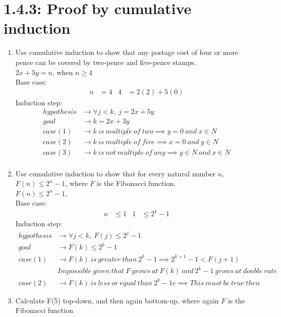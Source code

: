\documentclass{article}
\begin{document}
\section*{1.4.3: Proof by cumulative induction}
\begin{enumerate}
    \item Use cumulative induction to show that any postage cost of four or more pence can be covered by two-pence and five-pence stamps.\\
    $2x + 5y = n$, when $n \geq 4$\\
    Base case:
    \begin{align*}
        n &= 4 &4 &= 2(2) + 5(0)
    \end{align*}
    Induction step:
    \begin{align*}
        hypothesis &\rightarrow \forall j < k,\ j = 2x +5y\\
        goal &\rightarrow k = 2x + 3y\\
        case (1) &\rightarrow k\ is\ multiple\ of\ two \implies y = 0\ and\ x \in N\\
        case (2) &\rightarrow k\ is\ multiple\ of\ five \implies x = 0\ and\ y \in N\\
        case (3) &\rightarrow k\ is\ not\ multiple\ of\ any \implies y \in N\ and\ x \in N\\
    \end{align*}
    \item Use cumulative induction to show that for every natural number $n$, $F(n) \leq 2^{n}-1$, where $F$ is the Fibonacci function.\\
    $F(n) \leq 2^{n} -1$, \\
    Base case:
    \begin{align*}
        n &\leq 1 &1 &\leq 2^{1} - 1
    \end{align*}
    Induction step:
    \begin{align*}
        hypothesis &\rightarrow \forall j < k,\ F(j) \leq 2^{j} - 1\\
        goal &\rightarrow F(k) \leq 2^{k} -1\\
        case (1) &\rightarrow F(k)\ is\ greater\ than\ 2^{k} -1 \implies 2^{k+1} -1 < F(j +1)\\
        &Impossible\ given\ that\ F\ grows\ at\ F(k)\ and\ 2^{k} -1\ grows\ at\ double\ rate\\
        case (2) &\rightarrow F(k)\ is\ less\ or\ equal\ than\ 2^{k} -1e \implies This\ must\ be\ true\ then
    \end{align*}
    \item Calculate F(5) top-down, and then again bottom-up, where again $F$ is the Fibonacci function\\

\end{enumerate}
\end{document}

